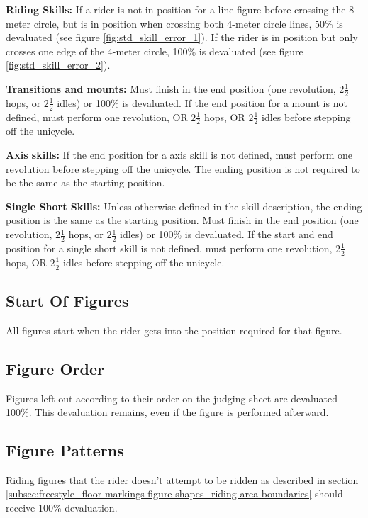 \textbf{Riding Skills:}
If a rider is not in position for a line figure before crossing the 8-meter circle, but is in position when crossing both 4-meter circle lines, 50\% is devaluated (see figure \ref{fig:std_skill_error_1}).
If the rider is in position but only crosses one edge of the 4-meter circle, 100\% is devaluated (see figure \ref{fig:std_skill_error_2}).

\textbf{Transitions and mounts:} Must finish in the end position (one revolution, $2 \frac{1}{2}$ hops, or $2 \frac{1}{2}$ idles) or 100\% is devaluated.
If the end position for a mount is not defined, must perform one revolution, OR $2 \frac{1}{2}$ hops, OR $2 \frac{1}{2}$ idles before stepping off the unicycle.

\textbf{Axis skills:} If the end position for a axis skill is not defined, must perform one revolution before stepping off the unicycle.
The ending position is not required to be the same as the starting position.

\textbf{Single Short Skills:} Unless otherwise defined in the skill description, the ending position is the same as the starting position.
Must finish in the end position (one revolution, $2 \frac{1}{2}$ hops, or $2 \frac{1}{2}$ idles) or 100\% is devaluated.
If the start and end position for a single short skill is not defined, must perform one revolution, $2 \frac{1}{2}$ hops, OR $2 \frac{1}{2}$ idles before stepping off the unicycle.

\subsection{Start Of Figures}

All figures start when the rider gets into the position required for that figure.

\subsection{Figure Order}

Figures left out according to their order on the judging sheet are devaluated 100\%.
This devaluation remains, even if the figure is performed afterward.

\subsection{Figure Patterns}

Riding figures that the rider doesn't attempt to be ridden as described in section \ref{subsec:freestyle_floor-markings-figure-shapes_riding-area-boundaries} should receive 100\% devaluation.

